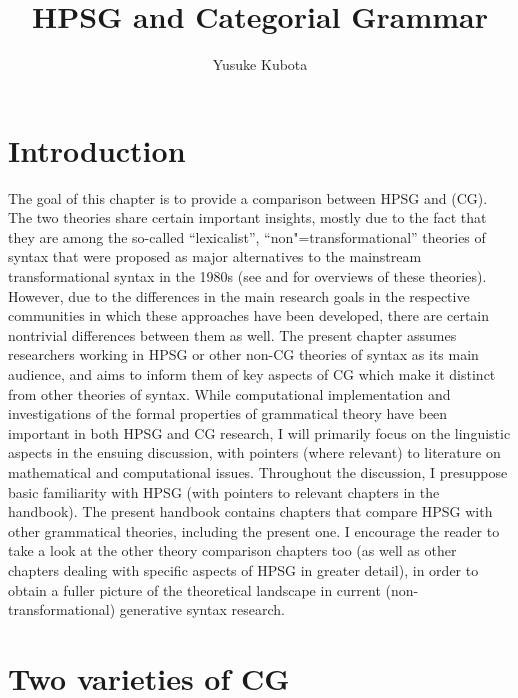\documentclass[output=paper
                ,modfonts
 	        ,biblatex
                ,babelshorthands
                ,newtxmath
                ,draftmode
                ,colorlinks, citecolor=brown
]{langscibook}
\author{Yusuke Kubota\affiliation{National Institute for Japanese Language and Linguistics}}
\title{HPSG and Categorial Grammar}
\begin{document}
\maketitle
\label{chap-cg}

\section{Introduction}

The goal of this chapter is to provide a comparison between HPSG and
 (CG). The two theories share certain important
insights, mostly due to the fact that they are among the so-called
``lexicalist'', ``non"=transformational'' theories of syntax that were
proposed as major alternatives to the mainstream transformational
syntax in the 1980s (see \citealt{BB2011a} and \citealt{MuellerGT-Eng3}
for overviews of these 
theories). However, due to the differences in the main research goals
in the respective communities in which these approaches have been
developed, there are certain nontrivial differences between them as
well. The present chapter assumes researchers working in HPSG or other
non-CG theories of syntax as its main audience, and aims to inform
them of key aspects of CG which make it distinct from other theories
of syntax. While computational implementation and investigations of the
formal properties of grammatical theory have been important in both
HPSG and CG research, I will primarily focus on the linguistic aspects
in the ensuing discussion, with pointers (where relevant) to literature on mathematical
and computational issues. Throughout the discussion, I presuppose
basic familiarity with HPSG (with pointers to relevant chapters in the
handbook). The present handbook contains chapters that compare HPSG
with other grammatical theories, including the present one. I
encourage the reader to take a look at the other theory comparison
chapters too (as well as other chapters dealing with specific
aspects of HPSG in greater detail), in order to obtain a fuller picture of the
theoretical landscape in current (non-transformational) generative
syntax research.


\section{Two varieties of CG \label{cgexposition}}
\end{document}
